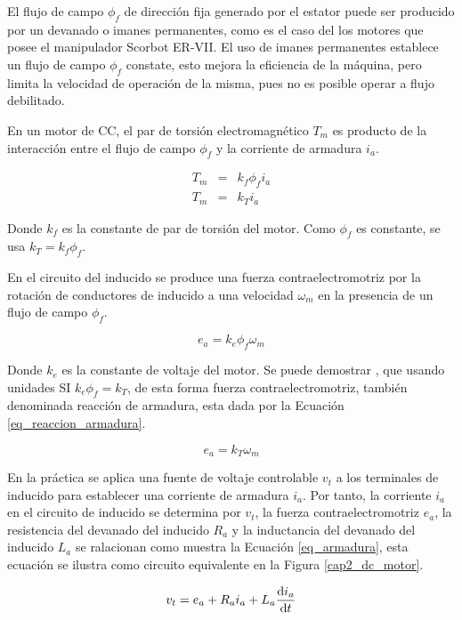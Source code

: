 El flujo de campo $\phi_f$ de dirección fija generado por el estator puede ser producido por un devanado o imanes permanentes, como es el caso del los motores que posee el manipulador Scorbot ER-VII. El uso de imanes permanentes establece un flujo de campo $\phi_f$ constate, esto mejora la eficiencia de la máquina, pero limita la velocidad de operación de la misma, pues no es posible operar a flujo debilitado.

En un motor de CC, el par de torsión electromagnético $T_m$ es producto de la interacción entre el flujo de campo $\phi_f$ y la corriente de armadura $i_a$.

\begin{eqnarray}
T_m &=& k_f \phi_f i_a \\
T_m &=& k_T i_a
\end{eqnarray}

Donde $k_f$ es la constante de par de torsión del motor. Como $\phi_f$ es constante, se usa $k_T= k_f \phi_f$.

En el circuito del inducido se produce una fuerza contraelectromotriz por la rotación de conductores de inducido a una velocidad $\omega_m$ en la presencia de un flujo de campo $\phi_f$.

\begin{equation}
e_a = k_e \phi_f \omega_m
\end{equation}

Donde $k_e$ es la constante de voltaje del motor. Se puede demostrar \cite{mohan}, que usando unidades SI $k_e \phi_f = k_T$, de esta forma fuerza contraelectromotriz, también denominada reacción de armadura, esta dada por la Ecuación \ref{eq_reaccion_armadura}.

\begin{equation}\label{eq_reaccion_armadura}
e_a = k_T \omega_m
\end{equation}

En la práctica se aplica una fuente de voltaje controlable $v_t$ a los terminales de inducido para establecer una corriente de armadura $i_a$. Por tanto, la corriente $i_a$ en el circuito de inducido se determina por $v_t$, la fuerza contraelectromotriz $e_a$, la resistencia del devanado del inducido $R_a$ y la inductancia del devanado del inducido $L_a$ se ralacionan como muestra la Ecuación \ref{eq_armadura}, esta ecuación se ilustra como circuito equivalente en la Figura \ref{cap2_dc_motor}.

\begin{equation}\label{eq_armadura}
v_t = e_a + R_a i_a + L_a \dv{i_a}{t}
\end{equation}

